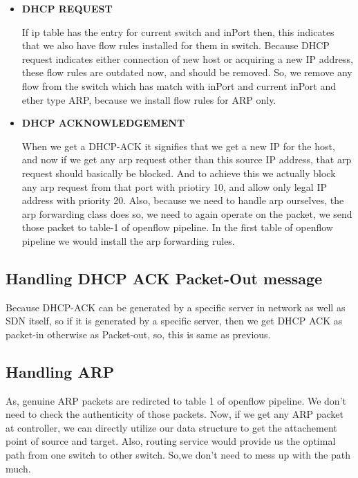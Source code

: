\documentclass{article}
\begin{document}
\begin{itemize}
	\item \textbf{DHCP REQUEST}

		If ip table has the entry for current switch and inPort then, this indicates that we also have flow rules installed for them in switch.
		Because DHCP request indicates either connection of new host or acquiring a new IP address, these flow rules are outdated now, and should be removed.
		So, we remove any flow from the switch which has match with inPort and current inPort and ether type ARP, because we install flow rules for ARP only.

	\item \textbf{DHCP ACKNOWLEDGEMENT}

		When we get a DHCP-ACK it signifies that we get a new IP for the host, and now if we get any arp request other than this source IP address, that arp request should basically be blocked.
		And to achieve this we actually block any arp request from that port with priotiry 10, and allow only legal IP address with priority 20. Also, because we need to handle arp ourselves, the arp forwarding class does so, we need to again operate on the packet, we send those packet to table-1 of openflow pipeline.
		In the first table of openflow pipeline we would install the arp forwarding rules.

\end{itemize}
\subsection{Handling DHCP ACK Packet-Out message}

Because DHCP-ACK can be generated by a specific server in network as well as SDN itself, so if it is generated by a specific server, then we get DHCP ACK as packet-in otherwise as Packet-out, so, this is same as previous.

\subsection{Handling ARP}

As, genuine ARP packets are redircted to table 1 of openflow pipeline.
We don't need to check the authenticity of those packets.
Now, if we get any ARP packet at controller, we can directly utilize our data structure to get the attachement point of source and target.
Also, routing service would provide us the optimal path from one switch to other switch. So,we don't need to mess up with the path much.
\end{document}
